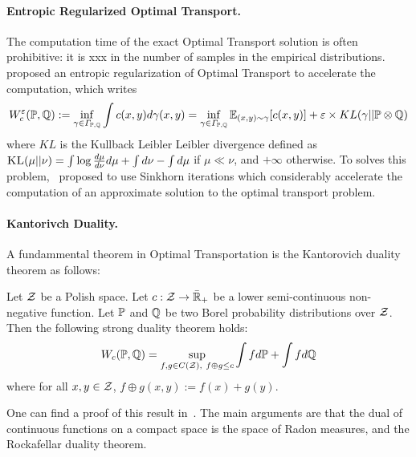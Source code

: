 \paragraph{Entropic Regularized Optimal Transport.} The computation time of the exact Optimal Transport solution is often prohibitive: it is xxx in the number of samples in the empirical distributions.~\cite{cuturi2013sinkhorn,peyre2019computational} proposed an entropic regularization of Optimal Transport to accelerate the computation, which writes
\begin{align*}
    W_c^\varepsilon(\PP,\QQ):=\inf_{\gamma\in\Gamma_{\PP,\QQ}}\int c(x,y) d\gamma(x,y) = \inf_{\gamma\in\Gamma_{\PP,\QQ}}\mathbb{E}_{(x,y)\sim\gamma}\left[c(x,y) \right] +\varepsilon\times KL(\gamma||\PP\otimes \QQ)
\end{align*} 
where $KL$ is the Kullback Leibler Leibler divergence defined as $\textsc{KL}(\mu||\nu) = \int\log{\frac{d\mu}{d\nu}}d\mu+\int  d\nu - \int d\mu$  if $\mu\ll \nu$, and $+\infty$ otherwise. To solves this problem,~\cite{cuturi2013sinkhorn} proposed to use Sinkhorn iterations which considerably accelerate the computation of an approximate solution to the optimal transport problem.

\paragraph{Kantorivch Duality.} A fundammental theorem in Optimal Transportation is the Kantorovich duality theorem as follows:

\begin{thm}
    Let $\mathcal{Z}$ be a Polish space. Let $c:\mathcal{Z}\to\bar{\mathbb{R}}_+$ be a lower semi-continuous non-negative function. Let $\mathbb{P}$ and $\mathbb{Q}$ be two Borel probability distributions over $\mathcal{Z}$. Then   the following strong duality theorem holds:
\begin{align*}
    W_c(\mathbb{P},\mathbb{Q})=\sup_{f,g\in C(\mathcal{Z}),~f\oplus g\leq c}   \int fd\mathbb{P}+\int fd\mathbb{Q}
\end{align*}
where for all $x,y\in\mathcal{Z}$, $f\oplus g(x,y):=f(x)+g(y)$. 
\end{thm}
One can find a proof of this result in~\citep{villani2003topics}. The main arguments are that the dual of continuous functions on  a compact space is the space of Radon measures, and the Rockafellar duality theorem.  


